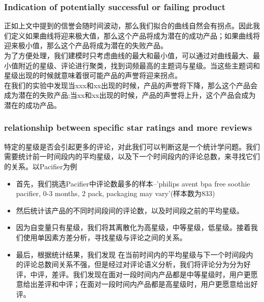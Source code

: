 \documentclass{mcmthesis}
\begin{document}
\subsubsection{Indication of potentially successful or failing product}
正如上文中提到的信誉会随时间波动，那么我们拟合的曲线自然会有拐点。因此我们定义如果曲线将迎来极大值，那么这个产品将成为潜在的成功产品；如果曲线将迎来极小值，那么这个产品将成为潜在的失败产品。\\

为了方便处理，我们建模时只考虑曲线的最大和最小值，可以通过对曲线最大、最小值附近的星级、评论进行聚类，找到词频最高的主题词与星级。当这些主题词和星级出现的时候就意味着很可能产品的声誉将迎来拐点。\\

在我们的实验中发现当xxx和xx出现的时候，产品的声誉将下降，那么这个产品会成为潜在的失败产品;当xx和xx出现的时候，产品的声誉将上升，这个产品会成为潜在的成功产品。

\subsubsection{relationship between specific star ratings and more reviews}
特定的星级是否会引起更多的评论，对此我们可以判断这是一个统计学问题。我们需要统计前一时间段内的平均星级，以及下一个时间段内的评论总数，来寻找它们的关系。以Pacifier为例
\begin{itemize}
	\item 首先，我们挑选Pacifier中评论数最多的样本--'philips avent bpa free soothie pacifier, 0-3 months, 2 pack, packaging may vary'(样本数为833)
	\item 然后统计该产品的不同时间段间的评论数，以及时间段之前的平均星级。
	\item 因为自变量只有星级，我们将其离散化为高星级，中等星级，低星级。接着我们使用单因素方差分析，寻找星级与评论之间的关系。
	\item 最后，根据统计结果，我们发现
	在当前时间内的平均星级与下一个时间段内的评论总数间关系不强，但是经过对评论语义分析，我们将评论分为分为好评，中评，差评。我们发现在面对一段时间内产品都是中等星级时，用户更愿意给出差评和中评；在面对一段时间内产品都是高星级时，用户更愿意给出好评。	
\end{itemize}
\end{document}
